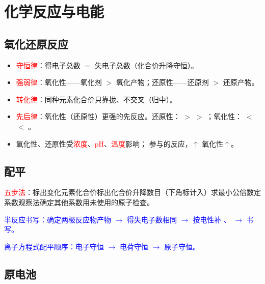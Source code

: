     \section{化学反应与电能}\label{app:知识点-电化学}

        \subsection{氧化还原反应}

            \begin{itemize}
                \item \textcolor{red}{守恒律}：得电子总数 \(=\) 失电子总数（化合价升降守恒）。
                \item \textcolor{red}{强弱律}：氧化性——氧化剂 \(>\) 氧化产物；还原性——还原剂 \(>\) 还原产物。
                \item \textcolor{red}{转化律}：同种元素化合价只靠拢、不交叉（归中）。
                \item \textcolor{red}{先后律}：氧化性（还原性）更强的先反应。还原性： \(>\)  \(>\) ；氧化性： \(<\)  \(<\) 。
                \item 氧化性、还原性受\textcolor{red}{浓度}、\textcolor{red}{pH}、\textcolor{red}{温度}影响； 参与的反应，\(\uparrow\) 氧化性\(\uparrow\)。
            \end{itemize}

        \subsection{配平}

            \textcolor{red}{五步法}：标出变化元素化合价标出化合价升降数目（下角标计入）求最小公倍数定系数观察法确定其他系数用未使用的原子检查。

            \textcolor{blue}{半反应书写：确定两极反应物产物 \(\to\) 得失电子数相同 \(\to\) 按电性补 、 \(\to\) 书写。}

            \textcolor{blue}{离子方程式配平顺序：电子守恒 \(\to\) 电荷守恒 \(\to\) 原子守恒。}

        \subsection{原电池}

